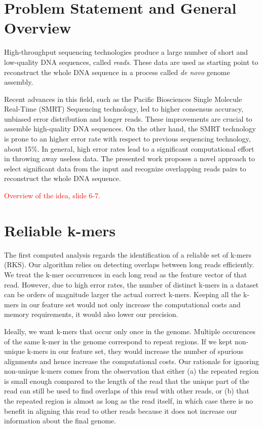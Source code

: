 \documentclass[11pt]{article}
\newcommand\myworries[1]{\textcolor{red}{#1}}
\begin{document}
\maketitle

\section{Problem Statement and General Overview}\label{intro}

High-throughput sequencing technologies produce a large number of short and low-quality DNA sequences, called \emph{reads}.
These data are used as starting point to reconstruct the whole DNA sequence in a process called \emph{de novo} genome assembly.

Recent advances in this field, such as the Pacific Biosciences Single Molecule Real-Time (SMRT) Sequencing technology, led to higher consensus accuracy, unbiased error distribution and longer reads.
These improvements are crucial to assemble high-quality DNA sequences.
On the other hand, the SMRT technology is prone to an higher error rate with respect to previous sequencing technology, about 15\%.
In general, high error rates lead to a significant computational effort in throwing away useless data.
The presented work proposes a novel approach to select significant data from the input and recognize overlapping reads pairs to reconstruct the whole DNA sequence.

\myworries{Overview of the idea, slide 6-7.}

\section{Reliable k-mers}\label{rks}

The first computed analysis regards the identification of a reliable set of k-mers (RKS). 
Our algorithm relies on detecting overlaps between long reads efficiently.
We treat the k-mer occurrences in each long read as the feature vector of that read. 
However, due to high error rates, the number of distinct k-mers in a dataset can be orders of magnitude larger the actual correct k-mers. 
Keeping all the k-mers in our feature set would not only increase the computational costs and memory requirements, it would also lower our precision.

Ideally, we want k-mers that occur only once in the genome. 
Multiple occurences of the same k-mer in the genome correspond to repeat regions. 
If we kept non-unique k-mers in our feature set, they would increase the number of spurious alignments and hence increase the computational costs. 
Our rationale for ignoring non-unique k-mers comes from the observation that either (a) the repeated region is small enough compared to the length of the read that the unique part of the read can still be used to find overlaps of this read with other reads, or (b) that the repeated region is almost as long as the read itself, in which case there is no benefit in aligning this read to other reads because it does not increase our information about the final genome. 
\end{document}

